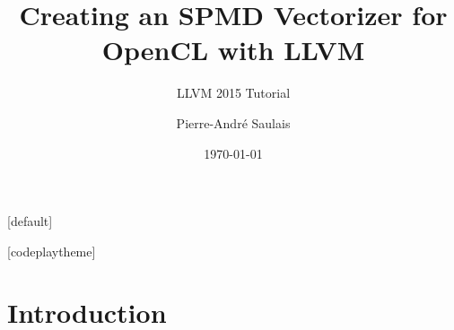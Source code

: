 \documentclass[t,aspectratio=169]{beamer}
\title{Creating an SPMD Vectorizer for OpenCL with LLVM}
\subtitle{LLVM 2015 Tutorial}
\author{Pierre-André Saulais}
\institute{Codeplay Software \\ @codeplaysoft}
\date{\today}
\begin{document}
[default]

\begin{frame}
  \vspace{4ex}
  \titlepage
\end{frame}


[codeplaytheme]

\section*{Introduction}
\end{document}
